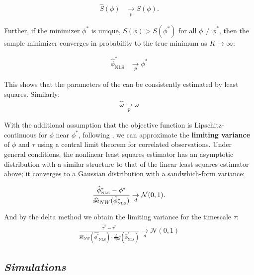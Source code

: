 \documentclass[main.tex]{subfiles}
\begin{document}
\begin{align}
\widehat{S}(\phi) &\underset{p}{\to} S(\phi).
\end{align}

\noindent Further, if the minimizer $\phi^*$ is unique, $S(\phi) > S(\phi^*)$ for all $\phi \ne \phi^*$, then the sample minimizer converges in probability to the true minimum as $K\to\infty$:

\begin{align}
\hat \phi^*_{\scriptscriptstyle\text{NLS}} &\underset{p}{\to} \phi^*
\end{align}

\noindent This shows that the parameters of the  can be consistently estimated by least squares. Similarly:
\begin{align}
\hat \omega \underset{p}{\to} \omega
\end{align}


With the additional assumption that the objective function is Lipschitz-continuous for $\phi$ near $\phi^*$, following \citet[theorem~23.2]{hansen_econometrics_2022}, we can approximate the \textbf{limiting variance} of $\phi$ and $\tau$ using a central limit theorem for correlated observations. Under general conditions, the nonlinear least squares estimator has an asymptotic distribution with a similar structure to that of the linear least squares estimator above; it converges to a Gaussian distribution with a sandwhich-form variance:

\begin{align}
\frac{\hat\phi^*_{\scriptscriptstyle\scriptscriptstyle\text{NLS}} - \phi^*}{\widehat{\text{se}}_{NW}(\hat\phi^*_{\scriptscriptstyle\text{NLS}})} \underset{d}{\to} \mathcal{N}(0, 1). \label{eq:nls-phi-clt}
\end{align}

\noindent And by the delta method we obtain the limiting variance for the timescale $\tau$:
\begin{align}
\frac{\hat{\tau^*} - \tau^*}{\widehat{\text{se}}_{NW}(\hat{\phi^*}_{\scriptscriptstyle\text{NLS}}) \cdot \frac{d}{d\phi}g(\hat\phi^*_{\scriptscriptstyle\text{NLS}})} \underset{d}{\to} \mathcal{N}(0,1)
\end{align}

\subsection{\textit{Simulations}}\label{sec:simulations}
\end{document}
